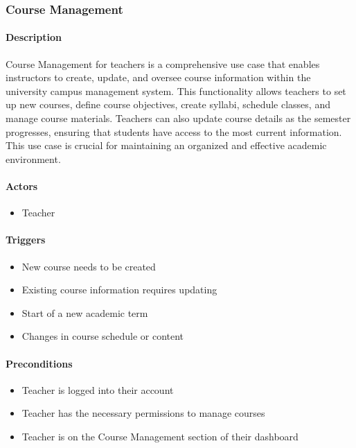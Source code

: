 \subsubsection{Course Management}

\paragraph{Description}
Course Management for teachers is a comprehensive use case that enables instructors to create, update, and oversee course information within the university campus management system. This functionality allows teachers to set up new courses, define course objectives, create syllabi, schedule classes, and manage course materials. Teachers can also update course details as the semester progresses, ensuring that students have access to the most current information. This use case is crucial for maintaining an organized and effective academic environment.

\paragraph{Actors}
\begin{itemize}
    \item Teacher
\end{itemize}

\paragraph{Triggers}
\begin{itemize}
    \item New course needs to be created
    \item Existing course information requires updating
    \item Start of a new academic term
    \item Changes in course schedule or content
\end{itemize}

\paragraph{Preconditions}
\begin{itemize}
    \item Teacher is logged into their account
    \item Teacher has the necessary permissions to manage courses
    \item Teacher is on the Course Management section of their dashboard
\end{itemize}

